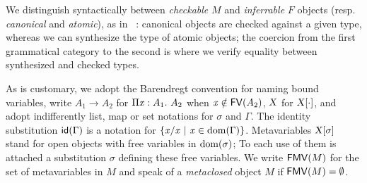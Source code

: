 \documentclass{llncs}
\begin{document}
We distinguish syntactically between \emph{checkable} $M$ and
\emph{inferrable} $F$ objects (resp. \emph{canonical} and
\emph{atomic}), as in \eg\ \cite{pierce2000local}: canonical objects
are checked against a given type, whereas we can synthesize the type
of atomic objects; the coercion from the first grammatical category to
the second is where we verify equality between synthesized and checked
types.

As is customary, we adopt the Barendregt convention for naming bound
variables, write $A_1\to A_2$ for $\Pi{\ensuremath{\text{\textit{x}}}}:{A_1}.\  {A_2}$ when $\text{\textit{x}}\notin
{\text{\textsf{FV}}}({A_2})$, $\text{\textsl{X}}$ for ${\text{\textsl{X}}}[{\cdot}]$, and adopt indifferently
list, map or set notations for $\sigma$ and $\Gamma$. The identity
substitution ${\text{\textsf{id}}}({\Gamma})$ is a notation for $\{{\text{\textit{x}}}/{\text{\textit{x}}}\ |\ \text{\textit{x}} \in\operatorname{dom}{\!(\Gamma)}\}$. Metavariables ${\text{\textsl{X}}}[{\sigma}]$
stand for open objects with free variables in $\operatorname{dom}{\!(\sigma)}$; To each
use of them is attached a substitution $\sigma$ defining these free
variables. We write ${\text{\textsf{FMV}}}({M})$ for the set of metavariables in $M$ and
speak of a \emph{metaclosed} object $M$ if ${\text{\textsf{FMV}}}({M}) = \emptyset$.


\end{document}
